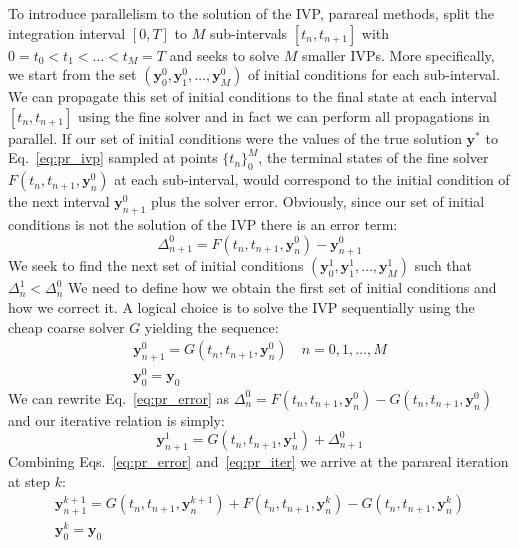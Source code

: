 \documentclass[11pt]{report}
\begin{document}
    To introduce parallelism to the solution of the IVP, parareal methods, split the integration interval $[0, T]$ to $M$
    sub-intervals $[t_n, t_{n+1}]$ with $0 = t_0 < t_1 < \dots < t_M = T$ and seeks to solve $M$ smaller IVPs.
    More specifically, we start from the set $(\pmb{y}_0^{0}, \pmb{y}_1^{0}, \dots ,\pmb{y}_M^{0})$ of initial
    conditions for each sub-interval.
    We can propagate this set of initial conditions to the final state at each interval $[t_n, t_{n+1}]$ using the fine
    solver and in fact we can perform all propagations in parallel.
    If our set of initial conditions were the values of the true solution $\pmb{y}^*$ to Eq.~\ref{eq:pr_ivp} sampled at
    points $\{t_n\}_0^M$, the terminal states of the fine solver $F(t_n, t_{n+1}, \pmb{y}^0_n)$ at each sub-interval, would
    correspond to the initial condition of the next interval $\pmb{y}_{n+1}^0$ plus the solver error.
    Obviously, since our set of initial conditions is not the solution of the IVP there is an error term:
    \begin{equation}
        \label{eq:pr_error}
        \Delta^0_{n+1} = F(t_n, t_{n+1}, \pmb{y}^0_n) - \pmb{y}^0_{n+1}
    \end{equation}
    We seek to find the next set of initial conditions $(\pmb{y}_0^{1}, \pmb{y}_1^{1}, \dots ,\pmb{y}_M^{1})$ such that
    $\Delta_n^1 <  \Delta_n^0$
    We need to define how we obtain the first set of initial conditions and how we correct it.
    A logical choice is to solve the IVP sequentially using the cheap coarse solver $G$ yielding the sequence:
    \begin{gather}
        \label{eq:pr_init}
        \pmb{y}_{n+1}^0 = G(t_n, t_{n+1}, \pmb{y}_n^0) \quad n = 0,1, \dots, M \\
        \pmb{y}_0^0 = \pmb{y}_0
    \end{gather}
    We can rewrite Eq.~\eqref{eq:pr_error} as $\Delta_n^0 = F(t_n,t_{n+1}, \pmb{y}_n^0) - G(t_n, t_{n+1}, \pmb{y}_n^0)$
    and our iterative relation is simply:
    \begin{equation}
        \label{eq:pr_iter}
        \pmb{y}^1_{n+1} = G(t_n, t_{n+1}, \pmb{y}_n^{1}) + \Delta_{n+1}^0
    \end{equation}
    Combining Eqs.~\eqref{eq:pr_error} and~\eqref{eq:pr_iter} we arrive at the parareal iteration at step $k$:
    \begin{gather}
        \label{}
        \pmb{y}^{k+1}_{n+1} = G(t_n, t_{n+1}, \pmb{y}_n^{k+1}) + F(t_n, t_{n+1}, \pmb{y}_n^{k}) - G(t_n, t_{n+1}, \pmb{y}_n^{k}) \\
        \pmb{y}_0^k = \pmb{y}_0
    \end{gather}
\end{document}
